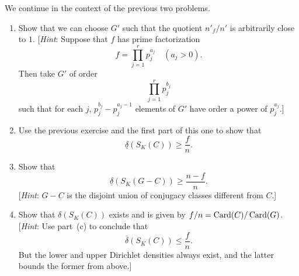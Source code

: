
\begin{exercise}[21]
  \label{ex:ch7-21}
  We continue in the context of the previous two problems.
  \begin{enumerate}[label=(\alph*)]
    \item Show that we can choose $G'$ such that the quotient $n'_f/n'$ is
      arbitrarily close to $1$. [\emph{Hint}: Suppose that $f$ has prime
      factorization
      \[
        f = \prod_{j=1}^{r} p_j^{a_j} \quad (a_j > 0).
      \]
      Then take $G'$ of order
      \[
        \prod_{j=1}^{r} p_j^{b_j}
      \]
      such that for each $j$, $p_j^{b_j} - p_j^{a_j-1}$ elements of $G'$ have
      order a power of $p_j^{a_j}$.]
    \item Use the previous exercise and the first part of this one to show
      that
      \[
        \underline{\delta}(S_K(C)) \ge \frac{f}{n}.
      \]
    \item Show that
      \[
        \underline{\delta}(S_K(G - C)) \ge \frac{n - f}{n}.
      \]
      [\emph{Hint}: $G - C$ is the disjoint union of conjugacy classes
      different from $C$.]
    \item Show that $\delta(S_K(C))$ exists and is given by
      $f/n = \operatorname{Card}(C)/\operatorname{Card}(G)$. [\emph{Hint}:
      Use part~(c) to conclude that
      \[
        \overline{\delta}(S_K(C)) \le \frac{f}{n}.
      \]
      But the lower and upper Dirichlet densities always exist, and the
      latter bounds the former from above.]
  \end{enumerate}
\end{exercise}

